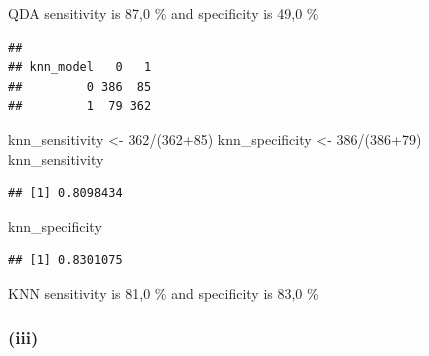 \documentclass[
]{article}
\newenvironment{Shaded}{\begin{snugshade}}{\end{snugshade}}
\newcommand{\AttributeTok}[1]{\textcolor[rgb]{0.77,0.63,0.00}{#1}}
\newcommand{\CommentTok}[1]{\textcolor[rgb]{0.56,0.35,0.01}{\textit{#1}}}
\newcommand{\ConstantTok}[1]{\textcolor[rgb]{0.00,0.00,0.00}{#1}}
\newcommand{\DecValTok}[1]{\textcolor[rgb]{0.00,0.00,0.81}{#1}}
\newcommand{\FunctionTok}[1]{\textcolor[rgb]{0.00,0.00,0.00}{#1}}
\newcommand{\NormalTok}[1]{#1}
\newcommand{\OtherTok}[1]{\textcolor[rgb]{0.56,0.35,0.01}{#1}}
\newcommand{\SpecialCharTok}[1]{\textcolor[rgb]{0.00,0.00,0.00}{#1}}
\newcommand{\StringTok}[1]{\textcolor[rgb]{0.31,0.60,0.02}{#1}}
\begin{document}
QDA sensitivity is 87,0 \% and specificity is 49,0 \%

\begin{Shaded}
\end{Shaded}

\begin{verbatim}
##          
## knn_model   0   1
##         0 386  85
##         1  79 362
\end{verbatim}

\begin{Shaded}
\begin{Highlighting}[]
\NormalTok{knn\_sensitivity }\OtherTok{\textless{}{-}} \DecValTok{362}\SpecialCharTok{/}\NormalTok{(}\DecValTok{362}\SpecialCharTok{+}\DecValTok{85}\NormalTok{)}
\NormalTok{knn\_specificity }\OtherTok{\textless{}{-}} \DecValTok{386}\SpecialCharTok{/}\NormalTok{(}\DecValTok{386}\SpecialCharTok{+}\DecValTok{79}\NormalTok{)}
\NormalTok{knn\_sensitivity}
\end{Highlighting}
\end{Shaded}

\begin{verbatim}
## [1] 0.8098434
\end{verbatim}

\begin{Shaded}
\begin{Highlighting}[]
\NormalTok{knn\_specificity}
\end{Highlighting}
\end{Shaded}

\begin{verbatim}
## [1] 0.8301075
\end{verbatim}

KNN sensitivity is 81,0 \% and specificity is 83,0 \%

\hypertarget{iii}{%
\subsubsection{(iii)}\label{iii}}

\begin{Shaded}
\end{Shaded}
\end{document}
